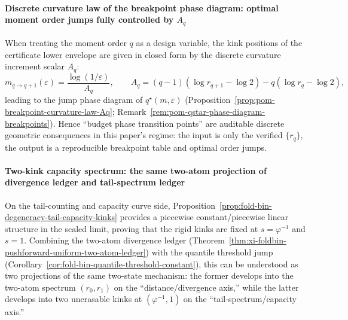 \paragraph{Discrete curvature law of the breakpoint phase diagram: optimal moment order jumps fully controlled by \texorpdfstring{$A_q$}{Aq}}
When treating the moment order \(q\) as a design variable, the kink positions of the certificate lower envelope are given in closed form by the discrete curvature increment scalar \(A_q\):
\[
m_{q\to q+1}(\varepsilon)=\frac{\log(1/\varepsilon)}{A_q},
\qquad
A_q=(q-1)(\log r_{q+1}-\log2)-q(\log r_q-\log2),
\]
leading to the jump phase diagram of \(q^\star(m,\varepsilon)\) (Proposition~\ref{prop:pom-breakpoint-curvature-law-Aq}; Remark~\ref{rem:pom-qstar-phase-diagram-breakpoints}).
Hence ``budget phase transition points'' are auditable discrete geometric consequences in this paper's regime: the input is only the verified \(\{r_q\}\), the output is a reproducible breakpoint table and optimal order jumps.

\paragraph{Two-kink capacity spectrum: the same two-atom projection of divergence ledger and tail-spectrum ledger}
On the tail-counting and capacity curve side, Proposition~\ref{prop:fold-bin-degeneracy-tail-capacity-kinks} provides a piecewise constant/piecewise linear structure in the scaled limit, proving that the rigid kinks are fixed at
\(
s=\varphi^{-1}
\)
and
\(
s=1
\).
Combining the two-atom divergence ledger (Theorem~\ref{thm:xi-foldbin-pushforward-uniform-two-atom-ledger}) with the quantile threshold jump (Corollary~\ref{cor:fold-bin-quantile-threshold-constant}), this can be understood as two projections of the same two-state mechanism: the former develops into the two-atom spectrum \((r_0,r_1)\) on the ``distance/divergence axis,'' while the latter develops into two unerasable kinks at \((\varphi^{-1},1)\) on the ``tail-spectrum/capacity axis.''

